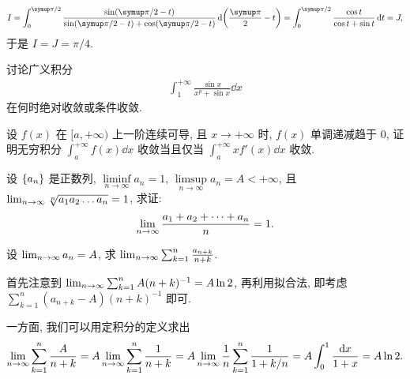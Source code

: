 \begin{exercise}[series=exer]
\begin{answer}
        \begin{align*}
            I = \int_{0}^{\pi/2} \frac{\sin(\pi/2 - t)}{\sin(\pi/2 - t) + \cos(\pi/2 - t)} \dd{\qty(\frac{\pi}{2} - t)} = \int_{0}^{\pi/2} \frac{\cos t}{\cos t + \sin t} \dd{t} = J,
        \end{align*}
        于是 $ I = J = \pi/4 $. 
    \end{answer}
    \item 讨论广义积分
    \begin{align*}
        \int_{1}^{+\infty} \frac{\sin x}{x^{p} + \sin x} \dd{x}
    \end{align*}
    在何时绝对收敛或条件收敛.
    \item 设 $ f(x) $ 在 $ [a, +\infty) $ 上一阶连续可导, 且 $ x \to +\infty $ 时, $ f(x) $ 单调递减趋于 $ 0 $, 证明无穷积分 $ \int_{a}^{+\infty} f(x) \dd{x} $ 收敛当且仅当 $ \int_{a}^{+\infty} xf'(x) \dd{x} $ 收敛. 
    \item 设 $ \qty{a_{n}} $ 是正数列, $ \liminf\limits_{n\to\infty} a_{n} = 1 $, $ \limsup\limits_{n\to\infty} a_{n} = A < +\infty $, 且 $ \lim_{n \to \infty} \sqrt[n]{a_{1}a_{2}\dots a_{n}} = 1 $, 求证:
    \begin{align*}
        \lim_{n \to \infty}\frac{a_{1} + a_{2} + \dots + a_{n}}{n} = 1.
    \end{align*}
    \item 设 $ \lim_{n \to \infty} a_{n} = A $, 求 $ \lim_{n \to \infty} \sum_{k=1}^{n} \frac{a_{n+k}}{n+k} $.  
    \begin{hint}
        首先注意到 $ \lim_{n \to \infty}\sum_{k = 1}^{n} A(n + k)^{-1} = A\ln 2 $, 再利用拟合法, 即考虑 $ \sum_{k = 1}^{n} (a_{n + k} - A)(n + k)^{-1} $ 即可. 
    \end{hint}
    \begin{answer}
        一方面, 我们可以用定积分的定义求出
        \begin{align*}
            \lim_{n \to \infty}\sum_{k = 1}^{n}\frac{A}{n + k} = A \lim_{n \to \infty}\sum_{k = 1}^{n} \frac{1}{n + k} = A \lim_{n \to \infty}\frac{1}{n} \sum_{k = 1}^{n}\frac{1}{1 + k/n} = A\int_{0}^{1} \frac{\dd x}{1 + x} = A\ln 2.
        \end{align*}
        

\end{answer}
\end{exercise}
